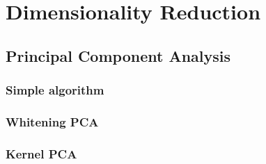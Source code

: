 \chapter{Dimensionality Reduction} %
\label{cha:dimensionality_reduction}

\section{Principal Component Analysis} %
	\label{sec:principal_component_analysis}
	
	\subsection{Simple algorithm} %
		\label{sub:simple_algorithm}
	

	\subsection{Whitening PCA} %
		\label{sub:whitening_pca}
	

	\subsection{Kernel PCA} %
		\label{sub:kernel_pca}
	
	

